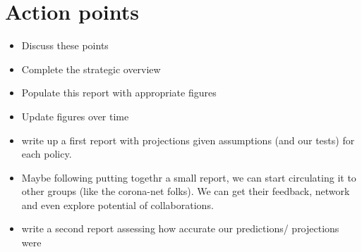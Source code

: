 \documentclass[
  english,
  ,doc,floatsintext]{apa6}
\begin{document}
\hypertarget{action-points}{%
\section{Action points}\label{action-points}}

\begin{itemize}
\item
  Discuss these points
\item
  Complete the strategic overview
\item
  Populate this report with appropriate figures
\item
  Update figures over time
\item
  write up a first report with projections given assumptions (and our tests) for each policy.
\item
  Maybe following putting togethr a small report, we can start circulating it to other groups (like the corona-net folks). We can get their feedback, network and even explore potential of collaborations.
\item
  write a second report assessing how accurate our predictions/ projections were
\end{itemize}
\end{document}
